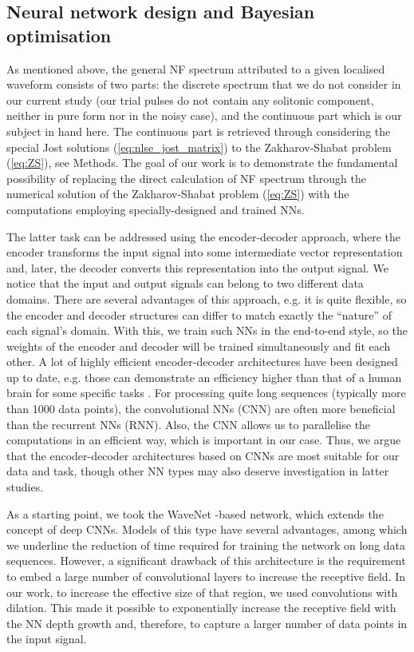 \subsection{Neural network design and Bayesian optimisation}


As mentioned above, the general NF spectrum attributed to a given localised waveform consists of two parts: the discrete spectrum that we do not consider in our current study (our trial pulses do not contain any solitonic component, neither in pure form nor in the noisy case), and the continuous part which is our subject in hand here. The continuous part is retrieved through considering the special Jost solutions (\ref{eq:nlse_jost_matrix}) to the Zakharov-Shabat problem (\ref{eq:ZS}), see Methods. The goal of our work is to demonstrate the fundamental possibility of replacing the direct calculation of NF spectrum through the numerical solution of the Zakharov-Shabat problem (\ref{eq:ZS}) with the computations employing specially-designed and trained NNs.

The latter task can be addressed using the encoder-decoder approach, where the encoder transforms the input signal into some intermediate vector representation and, later, the decoder converts this representation into the output signal. We notice that the input and output signals can belong to two different data domains. There are several advantages of this approach, e.g. it is quite flexible, so the encoder and decoder structures can differ to match exactly the ``nature'' of each signal's domain. With this, we train such NNs in the end-to-end style, so the weights of the encoder and decoder will be trained simultaneously and fit each other.
A lot of highly efficient encoder-decoder architectures have been designed up to date, e.g. those can demonstrate an efficiency higher than that of a human brain for some specific tasks \cite{ty2014deepface}. For processing quite long sequences (typically more than 1000 data points), the convolutional NNs (CNN) are often more beneficial than the recurrent NNs (RNN). Also, the CNN allows us to parallelise the computations in an efficient way, which is important in our case. Thus, we argue that the encoder-decoder architectures based on CNNs are most suitable for our data and task, though other NN types may also deserve investigation in latter studies.


As a starting point, we took the WaveNet \cite{od2016wavenet}-based network, which extends the concept of deep CNNs. 
Models of this type have several advantages, among which we underline the reduction of time required for training the network on long data sequences. 
However, a significant drawback of this architecture is the requirement to embed a large number of convolutional layers to increase the receptive field. In our work, to increase the effective size of that region, we used convolutions with dilation. This made it possible to exponentially increase the receptive field with the NN depth growth and, therefore, to capture a larger number of data points in the input signal.


